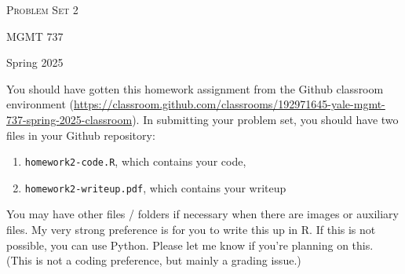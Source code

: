\documentclass[11pt, a4paper]{article}
\begin{document}
\begin{center}
  {\Large \textsc{Problem Set 2}}

  MGMT 737
\end{center}
\begin{center}
  Spring 2025
\end{center}

You should have gotten this homework assignment from the Github classroom environment (\url{https://classroom.github.com/classrooms/192971645-yale-mgmt-737-spring-2025-classroom}). In submitting your problem set, you should have two files in your Github repository:


\begin{enumerate}
  \item \texttt{homework2-code.R}, which contains your code,
  \item \texttt{homework2-writeup.pdf}, which contains your writeup 
\end{enumerate} 

You may have other files / folders if necessary when there are images or auxiliary files. My very strong preference is for you to write this up in R. If this is not possible, you can use Python. Please let me know if you're planning on this. (This is not a coding preference, but mainly a grading issue.)
\end{document}

